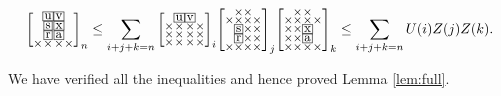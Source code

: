 \documentclass[a4paper,12pt]{article}
\makeatletter
\newcommand{\mybox}[1]{%
  \begingroup
  \setlength{\fboxsep}{1pt}%
  \fbox{\small #1}%
  \endgroup
}
\newenvironment{grid}
  {\begingroup\footnotesize
   \renewcommand{\arraystretch}{0}
   \setlength{\arraycolsep}{0pt}
   \left[\begin{array}{@{}*{10}{c}@{}}}
  {\end{array}\right]\endgroup}
\newcommand{\void}{\phantom{\times}}
\makeatother
\begin{document}
    \[
    \begin{grid}
			\void & \mybox{u} & \mybox{v} & \void \\
			\void & \mybox{s} & \mybox{x} & \void \\
			\void & \mybox{r} & \mybox{a} & \void \\
			\times & \times & \times & \times
    \end{grid}_n \le \sum_{i+j+k=n} \begin{grid}
			\void & \mybox{u} & \mybox{v} & \void \\
			\times & \times & \times & \times \\
			\times & \times & \times & \times \\
			\times & \times & \times & \times
    \end{grid}_i     \begin{grid}
			\void & \times & \times & \void \\
			\times & \times & \times & \times \\
			\void & \mybox{s} & \times & \times \\
			\void & \mybox{r} & \times & \times \\
			\times & \times & \times & \times
    \end{grid}_j     \begin{grid}
            \void & \times & \times & \void \\
			\times & \times & \times & \times \\
			\times & \times & \mybox{x} & \void \\
			\times & \times & \mybox{a} & \void \\
			\times & \times & \times & \times
    \end{grid}_k \le \sum_{i+j+k=n} U(i)Z(j)Z(k).
    \]

We have verified all the inequalities and hence proved Lemma \ref{lem:full}.




\end{document}
